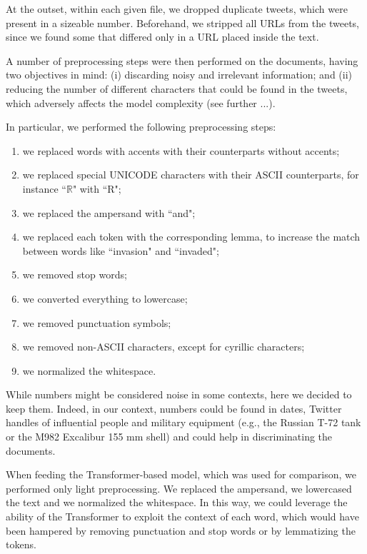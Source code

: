 \documentclass[runningheads]{llncs}
\begin{document}
At the outset, within each given file, we dropped duplicate tweets, which were present in a sizeable number. Beforehand, we stripped all URLs from the tweets, since we found some that differed only in a URL placed inside the text.  

A number of preprocessing steps were then performed on the documents, having two objectives in mind: (i) discarding noisy and irrelevant information; and (ii) reducing the number of different characters that could be found in the tweets, which adversely affects the model complexity (see further ...). 

In particular, we performed the following preprocessing steps:

\begin{enumerate}
    \item we replaced words with accents with their counterparts without accents;
    \item we replaced special UNICODE characters with their ASCII counterparts, for instance “$\mathbb{R}$" with “R";
    \item we replaced the ampersand with “and";
    \item we replaced each token with the corresponding lemma, to increase the match between words like “invasion" and “invaded";
    \item we removed stop words;
    \item we converted everything to lowercase;
    \item we removed punctuation symbols;
    \item we removed non-ASCII characters, except for cyrillic characters;
    \item we normalized the whitespace.
\end{enumerate}

While numbers might be considered noise in some contexts, here we decided to keep them. Indeed, in our context, numbers could be found in dates, Twitter handles of influential people and military equipment (e.g., the Russian T-72 tank or the M982 Excalibur 155 mm shell) and could help in discriminating the documents.

When feeding the Transformer-based model, which was used for comparison, we performed only light preprocessing. We replaced the ampersand, we lowercased the text and we normalized the whitespace. In this way, we could leverage the ability of the Transformer to exploit the context of each word, which would have been hampered by removing punctuation and stop words or by lemmatizing the tokens.
\end{document}
